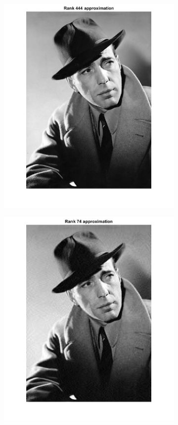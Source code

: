 \documentclass[12pt]{tehranReport}
\begin{document}
	\begin{figure}[h!]
		\begin{subfigure}{.55\textwidth}
			\includegraphics[width=\linewidth, height=\textheight,keepaspectratio]{pics/4}
			\label{fig:sub1}
		\end{subfigure}%
		\begin{subfigure}{.55\textwidth}
			\centering
			\includegraphics[width=\linewidth, height=\textheight,keepaspectratio]{pics/5}

\end{subfigure}
\end{figure}
\end{document}
